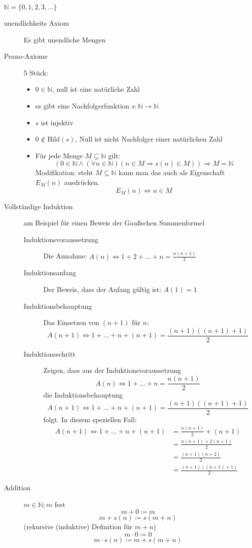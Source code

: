 $\mathbb{N} = \lbrace 0, 1, 2, 3, \dots \rbrace$
\begin{description}
    \item[unendlichkeits Axiom] Es gibt unendliche Mengen
    \item[Peano-Axiome] 5 Stück:
    \begin{itemize}
        \item $0 \in \mathbb{N}$, null ist eine natürliche Zahl
        \item es gibt eine Nachfolgerfunktion $s : \mathbb{N} \longrightarrow \mathbb{N}$
        \item $s$ ist injektiv
        \item $0 \not \in \textrm{Bild}(s)$, Null ist nicht Nachfolger einer natürlichen Zahl
        \item Für jede Menge $M \subseteq \mathbb{N}$ gilt:
        \[(0 \in \mathbb{N} \wedge (\forall n \in \mathbb{N})(n \in M \Rightarrow s(n) \in M)) \Rightarrow M = \mathbb{N}\]
        Modifikation: steht $M \subseteq \mathbb{N}$ kann man das auch als Eigenschaft $E_M(n)$ ausdrücken.
        \[E_M(n) \Leftrightarrow n \in M\]
    \end{itemize}
    \item[Vollständige Induktion] am Beispiel für einen Beweis der Gaußschen Summenformel
    \begin{description}
        \item[Induktionsvoraussetzung] Die Annahme: $A(n) \Leftrightarrow 1 + 2 + \dots + n = \frac{n(n+1)}{2}$
        \item[Induktionsanfang] Der Beweis, dass der Anfang gültig ist: $A(1) = 1$
        \item[Induktionsbehauptung] Das Einsetzen von $(n + 1)$ für $n$:
        \[A(n + 1) \Leftrightarrow 1 + \dots + n + (n + 1)= \frac{(n + 1)((n + 1)+1)}{2}\]
        \item[Induktionsschritt] Zeigen, dass aus der Induktionsvoraussetzung
        \[A(n) \Leftrightarrow 1 + \dots + n = \frac{n(n+1)}{2}\]
        die Induktionsbehauptung
        \[A(n + 1) \Leftrightarrow 1 + \dots + n + (n + 1) = \frac{(n + 1)((n + 1)+1)}{2}\]
        folgt. In diesem speziellen Fall:
        \begin{align*}
            A(n + 1) \Leftrightarrow 1 + \dots + n + (n + 1) & = \frac{n(n + 1)}{2} + (n + 1)  \\
            & = \frac{n(n + 1) + 2(n + 1)}{2} \\
            & = \frac{(n + 1)(n + 2)}{2}      \\
            & = \frac{(n + 1)((n + 1)+1)}{2}
        \end{align*}
    \end{description}
    \item[Addition] $m \in \mathbb{N}; m$ fest
    \[m+0\coloneqq m\]
    \[m + s(n) \coloneqq s(m + n)\]
    (rekursive (induktive) Definition für $m + n$)
    \[m \cdot 0\coloneqq 0\]
    \[m \cdot s(n) \coloneqq m + s(m + n)\]
\end{description}
